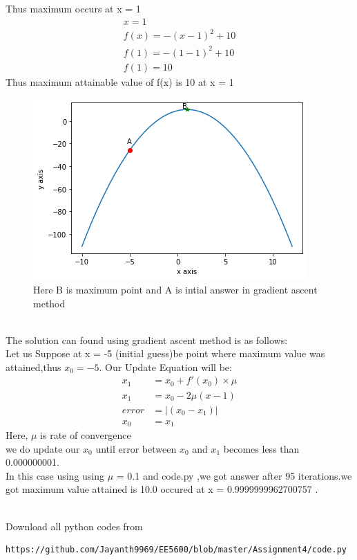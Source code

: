 \begin{enumerate}[label=\thesection.\arabic*.,ref=\thesection.\theenumi]
    Thus maximum occurs at x = 1 \\
    \begin{align}
        x = 1 \\
        f(x) = -(x-1)^2+10 \\
        f(1) = -(1-1)^2+10 \\
        f(1) = 10
    \end{align}
    Thus maximum attainable value of f(x) is 10 at x = 1 
    \begin{figure}[h]
    \includegraphics[width=\columnwidth]{Figure_1.png}
    \caption{Here B is maximum point and A is intial answer in gradient ascent method}
    \end{figure}\\

    
    The solution can found using gradient ascent method is as follows: \\
    Let us Suppose at x = -5 (initial guess)be point where maximum value was attained,thus $x_0 = -5$.
    Our Update Equation will be: 
    \begin{align}
        x_1 &= x_0 + f'(x_0) \times \mu \\
        x_1 &= x_0 - 2\mu(x-1) \\
        error &= \lvert (x_0 - x_1) \rvert\\
        x_0 &= x_1 
    \end{align}
    Here, $\mu$ is rate of convergence\\
    we do update our $x_0$ until error between $x_0$ and $x_1$ becomes less than 0.000000001. \\
    In this case using using $\mu$ = 0.1 and code.py ,we got answer after 95 iterations.we got maximum value  attained is 10.0 occured at x = 0.9999999962700757 .
    
\end{enumerate}
\\
Download all python codes from 
\begin{lstlisting}
https://github.com/Jayanth9969/EE5600/blob/master/Assignment4/code.py
\end{lstlisting}